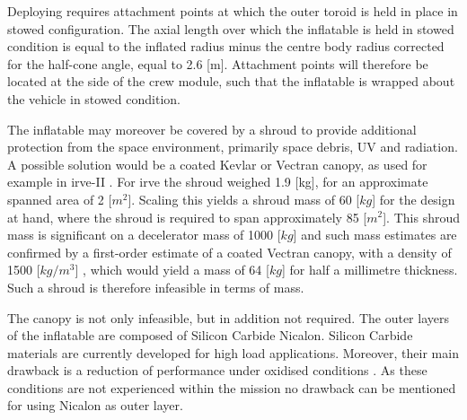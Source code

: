 Deploying requires attachment points at which the outer toroid is held in place in stowed configuration. The axial length over which the inflatable is held in stowed condition is equal to the inflated radius minus the centre body radius corrected for the half-cone angle, equal to 2.6 [m]. Attachment points will therefore be located at the side of the crew module, such that the inflatable is wrapped about the vehicle in stowed condition. 

The inflatable may moreover be covered by a shroud to provide additional protection from the space environment, primarily space debris, UV and radiation. A possible solution would be a coated Kevlar or Vectran canopy, as used for example in \gls{irve}-II \cite{Dillman2010}. For \gls{irve} the shroud weighed 1.9 [kg], for an approximate spanned area of 2 [$m^{2}$]. Scaling this yields a shroud mass of 60 [$kg$] for the design at hand, where the shroud is required to span approximately 85 [$m^{2}$]. This shroud mass is significant on a decelerator mass of 1000 [$kg$] and such mass estimates are confirmed by a first-order estimate of a coated Vectran canopy, with a density of 1500 [$kg/m^{3}$] \cite{Miller2014}, which would yield a mass of 64 [$kg$] for half a millimetre thickness. Such a shroud is therefore infeasible in terms of mass.

The canopy is not only infeasible, but in addition not required. The outer layers of the inflatable are composed of Silicon Carbide Nicalon. Silicon Carbide materials are currently developed for high load applications. Moreover, their main drawback is a reduction of performance under oxidised conditions \cite{Dutta2001}. As these conditions are not experienced within the mission no drawback can be mentioned for using Nicalon as outer layer.



